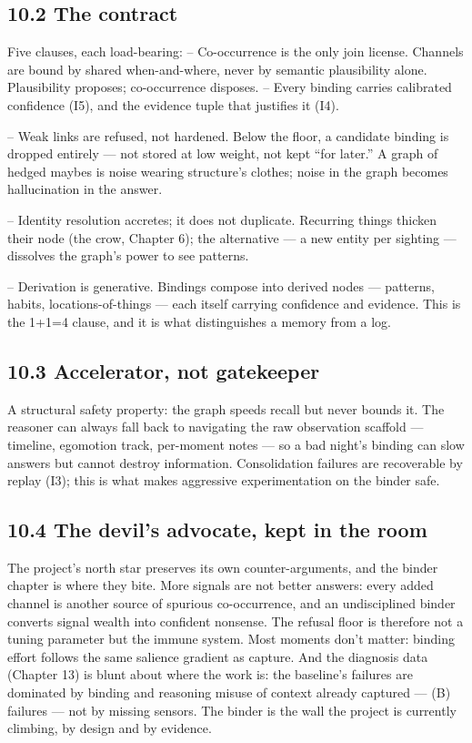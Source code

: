 \subsection{10.2 The contract}\label{the-contract}

Five clauses, each load-bearing: -- Co-occurrence is the only join license. Channels are bound by shared when-and-where, never by semantic plausibility alone. Plausibility proposes; co-occurrence disposes. -- Every binding carries calibrated confidence (I5), and the evidence tuple that justifies it (I4).

-- Weak links are refused, not hardened. Below the floor, a candidate binding is dropped entirely --- not stored at low weight, not kept ``for later.'' A graph of hedged maybes is noise wearing structure's clothes; noise in the graph becomes hallucination in the answer.

-- Identity resolution accretes; it does not duplicate. Recurring things thicken their node (the crow, Chapter 6); the alternative --- a new entity per sighting --- dissolves the graph's power to see patterns.

-- Derivation is generative. Bindings compose into derived nodes --- patterns, habits, locations-of-things --- each itself carrying confidence and evidence. This is the 1+1=4 clause, and it is what distinguishes a memory from a log.

\subsection{10.3 Accelerator, not gatekeeper}\label{accelerator-not-gatekeeper}

A structural safety property: the graph speeds recall but never bounds it. The reasoner can always fall back to navigating the raw observation scaffold --- timeline, egomotion track, per-moment notes --- so a bad night's binding can slow answers but cannot destroy information. Consolidation failures are recoverable by replay (I3); this is what makes aggressive experimentation on the binder safe.

\subsection{10.4 The devil's advocate, kept in the room}\label{the-devils-advocate-kept-in-the-room}

The project's north star preserves its own counter-arguments, and the binder chapter is where they bite. More signals are not better answers: every added channel is another source of spurious co-occurrence, and an undisciplined binder converts signal wealth into confident nonsense. The refusal floor is therefore not a tuning parameter but the immune system. Most moments don't matter: binding effort follows the same salience gradient as capture. And the diagnosis data (Chapter 13) is blunt about where the work is: the baseline's failures are dominated by binding and reasoning misuse of context already captured --- (B) failures --- not by missing sensors. The binder is the wall the project is currently climbing, by design and by evidence.

